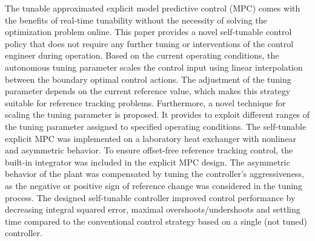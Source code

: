 \documentclass[preprint,12pt]{elsarticle}
\begin{document}
			The tunable approximated explicit model predictive control (MPC) comes with the benefits of real-time tunability without the necessity of solving the optimization problem online. This paper provides a novel self-tunable control policy that does not require any further tuning or interventions of the control engineer during operation. Based on the current operating conditions, the autonomous tuning parameter scales the control input using linear interpolation between the boundary optimal control actions. The adjustment of the tuning parameter depends on the current reference value, which makes this strategy suitable for reference tracking problems. Furthermore, a novel technique for scaling the tuning parameter is proposed. It provides to exploit different ranges of the tuning parameter assigned to specified operating conditions. The self-tunable explicit MPC was implemented on a laboratory heat exchanger with nonlinear and asymmetric behavior. To ensure offset-free reference tracking control, the built-in integrator was included in the explicit MPC design. The asymmetric behavior of the plant was compensated by tuning the controller's aggressiveness, as the negative or positive sign of reference change was considered in the tuning process. The designed self-tunable controller improved control performance by decreasing integral squared error, maximal overshoots/undershoots and settling time compared to the conventional control strategy based on a single (not tuned) controller. 
	
\end{document}
